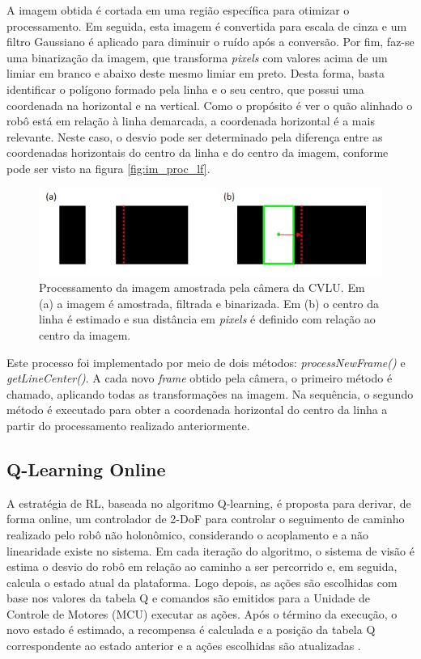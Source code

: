 \documentclass[a4paper]{ifacconf}
\begin{document}
A imagem obtida é cortada em uma região específica para otimizar o processamento. Em seguida, esta imagem é convertida para escala de cinza e um filtro Gaussiano é aplicado para diminuir o ruído após a conversão. Por fim, faz-se uma binarização da imagem, que transforma \textit{pixels} com valores acima de um limiar em branco e abaixo deste mesmo limiar em preto. Desta forma, basta identificar o polígono formado pela linha e o seu centro, que possui uma coordenada na horizontal e na vertical. Como o propósito é ver o quão alinhado o robô está em relação à linha demarcada, a coordenada horizontal é a mais relevante. Neste caso, o desvio pode ser determinado pela diferença entre as coordenadas horizontais do centro da linha e do centro da imagem, conforme pode ser visto na figura \autoref{fig:im_proc_lf}.

\begin{figure}
\centering 
\caption{Processamento da imagem amostrada pela câmera da CVLU. Em (a) a imagem é amostrada, filtrada e binarizada. Em (b) o centro da linha é estimado e sua distância em \textit{pixels} é definido com relação ao centro da imagem.} \label{fig:im_proc_lf}
\includegraphics[scale=0.55]{Figuras/im_proc_lf.jpg}
\end{figure} 

Este processo foi implementado por meio de dois métodos: \textit{processNewFrame()} e \textit{getLineCenter()}. A cada novo \textit{frame} obtido pela câmera, o primeiro método é chamado, aplicando todas as transformações na imagem. Na sequência, o segundo método é executado para obter a coordenada horizontal do centro da linha a partir do processamento realizado anteriormente. 

\subsection{Q-Learning Online}
A estratégia de RL, baseada no algoritmo Q-learning, é proposta para derivar, de forma online, um controlador de 2-DoF para controlar o seguimento de caminho realizado pelo robô não holonômico, considerando o acoplamento e a não linearidade existe no sistema. Em cada iteração do algoritmo, o sistema de visão é estima o desvio do robô em relação ao caminho a ser percorrido e, em seguida, calcula o estado atual da plataforma. Logo depois, as ações são escolhidas com base nos valores da tabela Q e comandos são emitidos para a Unidade de Controle de Motores (MCU) executar as ações. Após o término da execução, o novo estado é estimado, a recompensa é calculada e a posição da tabela Q correspondente ao estado anterior e a ações escolhidas são atualizadas \cite{qLearningDev}. 
\end{document}
